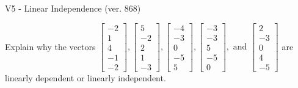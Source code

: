 \begin{exercise}
  \begin{exerciseTitle}V5 - Linear Independence (ver. 868)\end{exerciseTitle}
  \begin{exerciseStatement}
    Explain why the vectors \(\left[\begin{array}{r}
-2 \\
1 \\
4 \\
-1 \\
-2
\end{array}\right] , \left[\begin{array}{r}
5 \\
-2 \\
2 \\
1 \\
-3
\end{array}\right] , \left[\begin{array}{r}
-4 \\
-3 \\
0 \\
-5 \\
5
\end{array}\right] , \left[\begin{array}{r}
-3 \\
-3 \\
5 \\
-5 \\
0
\end{array}\right] , \text{ and } \left[\begin{array}{r}
2 \\
-3 \\
0 \\
4 \\
-5
\end{array}\right]\) are linearly dependent or linearly independent.	



\end{exerciseStatement}
\end{exercise}
